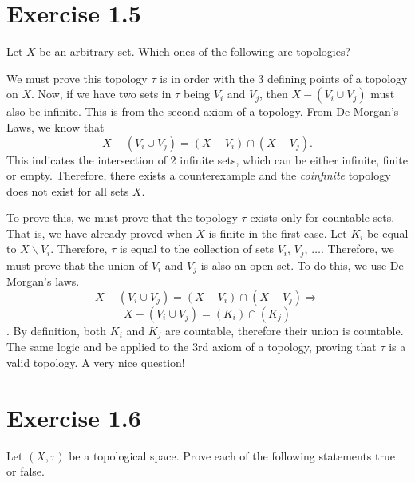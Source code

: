 \documentclass{report}
\begin{document}
\section{Exercise 1.5}
\begin{center}
Let $X$ be an arbitrary set. Which ones of the following are topologies?
\end{center}

\bigskip
\sol We must prove this topology $\tau$ is in order with the $3$ defining points of a topology on $X$. 
Now, if we have two sets in $\tau$ being $V_i$ and $V_j$, then $X - (V_i \cup V_j)$ must also be infinite. This is from the second axiom of a topology. From De Morgan's Laws, we know that
                    \[
                        X - ( V_i \cup V_j ) = (X - V_i) \cap (X - V_j).                  
                    \]
This indicates the intersection of $2$ infinite sets, which can be either infinite, finite or empty. Therefore, there exists a counterexample and the \textit{coinfinite} topology does not exist for all sets $X$. 

\medskip
\sol To prove this, we must prove that the topology $\tau$ exists only for countable sets. That is, we have already proved when $X$ is finite in the first case. Let $K_i$ be equal to $X \backslash V_i$. Therefore, $\tau$ is equal to the collection of sets $V_i$, $V_j$, $\dots$. Therefore, we must prove that the union of $V_i$ and $V_j$ is also an open set. To do this, we use De Morgan's laws.
                    \[X - (V_i \cup V_j) = (X-V_i) \cap (X-V_j) \Longrightarrow  \]
                    \[X - (V_i \cup V_j) = (K_i) \cap (K_j) \].
By definition, both $K_i$ and $K_j$ are countable, therefore their union is countable. The same logic and be applied to the $3$rd axiom of a topology, proving that $\tau$ is a valid topology. A very nice question!                            


\section{Exercise 1.6}
\begin{center}
    Let $(X, \tau)$ be a topological space. Prove each of the following statements true or false.         
\end{center}
    
\end{document}
